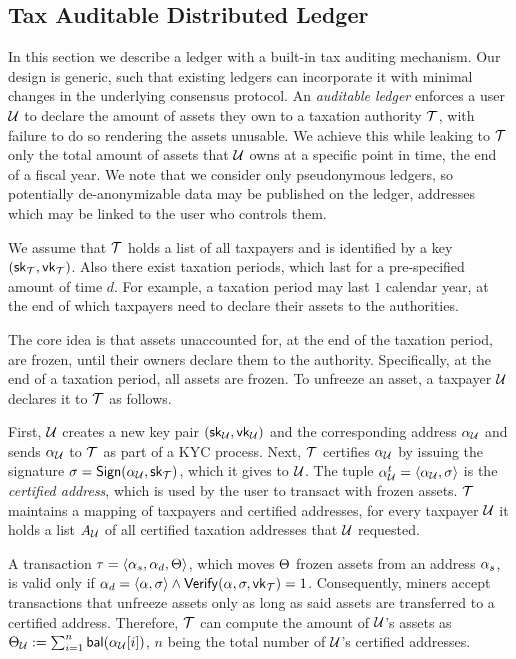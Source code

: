 \subsection{Tax Auditable Distributed Ledger}\label{sec:taxchain}

In this section we describe a ledger with a built-in tax auditing mechanism.
Our design is generic, such that existing ledgers can incorporate it with
minimal changes in the underlying consensus protocol. An \emph{auditable
ledger} enforces a user $\mathcal{U}$ to declare the amount of assets they own to a
taxation authority $\mathcal{T}$, with failure to do so rendering the assets
unusable. We achieve this while leaking to $\mathcal{T}$ only the total amount of
assets that $\mathcal{U}$ owns at a specific point in time, \eg the end of a fiscal
year. We note that we consider only pseudonymous ledgers, so potentially
de-anonymizable data may be published on the ledger, \eg addresses which may be
linked to the user who controls them.

We assume that $\mathcal{T}$ holds a list of all taxpayers and is identified by a
key $(\mathsf{sk}_{\mathcal{T}}, \mathsf{vk}_{\mathcal{T}})$. Also there exist taxation
periods, which last for a pre-specified amount of time $d$. For example, a
taxation period may last $1$ calendar year, at the end of which taxpayers need
to declare their assets to the authorities.

The core idea is that assets unaccounted for, at the end of the taxation
period, are frozen, until their owners declare them to the authority.
Specifically, at the end of a taxation period, all assets are frozen. To
unfreeze an asset, a taxpayer $\mathcal{U}$ declares it to $\mathcal{T}$ as follows.

First, $\mathcal{U}$ creates a new key pair $(\mathsf{sk}_{\mathcal{U}}, \mathsf{vk}_{\mathcal{U}})$
and the corresponding address $\alpha_{\mathcal{U}}$ and sends $\alpha_{\mathcal{U}}$
to $\mathcal{T}$ as part of a KYC process.  Next, $\mathcal{T}$ certifies $\alpha_{\mathcal{U}}$ by issuing the
signature $\sigma = \mathsf{Sign}(\alpha_{\mathcal{U}}, \mathsf{sk}_{\mathcal{T}})$, which it
gives to $\mathcal{U}$. The tuple $\alpha_{\mathcal{U}}^{t} = \langle \alpha_{\mathcal{U}},
\sigma \rangle$ is the \emph{certified address}, which is used by the user to
transact with frozen assets. $\mathcal{T}$ maintains a mapping of taxpayers and
certified addresses, \ie for every taxpayer $\mathcal{U}$ it holds a list $A_{\mathcal{U}}$
of all certified taxation addresses that $\mathcal{U}$ requested.

A transaction $\tau = \langle \alpha_{s}, \alpha_{d}, \Theta \rangle$,
which moves $\Theta$ frozen assets from an address $\alpha_{s}$, is valid
only if $\alpha_{d} = \langle \alpha, \sigma \rangle \land
\mathsf{Verify}(\alpha, \sigma, \mathsf{vk}_{\mathcal{T}}) = 1$. Consequently, miners
accept transactions that unfreeze assets only as long as said assets are
transferred to a certified address. Therefore, $\mathcal{T}$ can compute the
amount of $\mathcal{U}$'s assets as $\Theta_{\mathcal{U}} := \sum_{i=1}^{n}
\mathsf{bal}(\alpha_{\mathcal{U}}[i])$, $n$ being the total number of $\mathcal{U}$'s
certified addresses.

